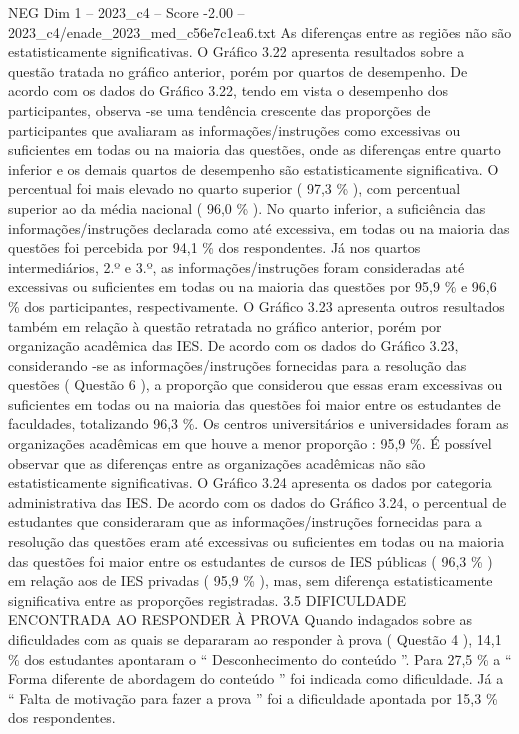 \begin{textsample}{NEG Dim 1 – 2023\_c4 – Score -2.00 – 2023\_c4/enade\_2023\_med\_c56e7c1ea6.txt}
As diferenças entre as regiões não são estatisticamente significativas.
O Gráfico 3.22 apresenta resultados sobre a questão tratada no gráfico anterior, porém por quartos de desempenho.
De acordo com os dados do Gráfico 3.22, tendo em vista o desempenho dos participantes, observa -se uma tendência crescente das proporções de participantes que avaliaram as informações/instruções como excessivas ou suficientes em todas ou na maioria das questões, onde as diferenças entre quarto inferior e os demais quartos de desempenho são estatisticamente significativa.
O percentual foi mais elevado no quarto superior ( 97,3 \% ), com percentual superior ao da média nacional ( 96,0 \% ).
No quarto inferior, a suficiência das informações/instruções declarada como até excessiva, em todas ou na maioria das questões foi percebida por 94,1 \% dos respondentes.
Já nos quartos intermediários, 2.º e 3.º, as informações/instruções foram consideradas até excessivas ou suficientes em todas ou na maioria das questões por 95,9 \% e 96,6 \% dos participantes, respectivamente.
O Gráfico 3.23 apresenta outros resultados também em relação à questão retratada no gráfico anterior, porém por organização acadêmica das IES.
De acordo com os dados do Gráfico 3.23, considerando -se as informações/instruções fornecidas para a resolução das questões ( Questão 6 ), a proporção que considerou que essas eram excessivas ou suficientes em todas ou na maioria das questões foi maior entre os estudantes de faculdades, totalizando 96,3 \%.
Os centros universitários e universidades foram as organizações acadêmicas em que houve a menor proporção : 95,9 \%.
É possível observar que as diferenças entre as organizações acadêmicas não são estatisticamente significativas.
O Gráfico 3.24 apresenta os dados por categoria administrativa das IES.
De acordo com os dados do Gráfico 3.24, o percentual de estudantes que consideraram que as informações/instruções fornecidas para a resolução das questões eram até excessivas ou suficientes em todas ou na maioria das questões foi maior entre os estudantes de cursos de IES públicas ( 96,3 \% ) em relação aos de IES privadas ( 95,9 \% ), mas, sem diferença estatisticamente significativa entre as proporções registradas. 3.5 DIFICULDADE ENCONTRADA AO RESPONDER À PROVA Quando indagados sobre as dificuldades com as quais se depararam ao responder à prova ( Questão 4 ), 14,1 \% dos estudantes apontaram o “ Desconhecimento do conteúdo ”.
Para 27,5 \% a “ Forma diferente de abordagem do conteúdo ” foi indicada como dificuldade.
Já a “ Falta de motivação para fazer a prova ” foi a dificuldade apontada por 15,3 \% dos respondentes.

\end{textsample}
